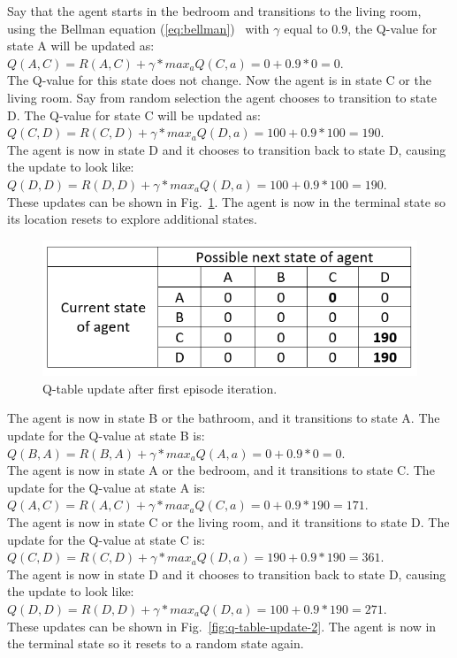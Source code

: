 \documentclass[12pt,american]{report}
\begin{document}
Say that the agent starts in the bedroom and transitions to the living room, using the Bellman equation (\ref{eq:bellman})~\cite{matiisen_2015} with $\gamma$ equal to 0.9, the Q-value for state A will be updated as: \\
$Q(A,C) = R(A,C) + \gamma*max_a Q(C,a) = 0 + 0.9*0 = 0$. \\ 
The Q-value for this state does not change.  Now the agent is in state C or the living room.  Say from random selection the agent chooses to transition to state D. The Q-value for state C will be updated as: \\
$Q(C,D) = R(C,D) + \gamma*max_a Q(D,a) = 100 + 0.9*100 = 190$. \\
The agent is now in state D and it chooses to transition back to state D, causing the update to look like: \\
$Q(D,D) = R(D,D) + \gamma*max_a Q(D,a) = 100 + 0.9*100 = 190$. \\
These updates can be shown in Fig.~\ref{fig:q-table-update-1}. The agent is now in the terminal state so its location resets to explore additional states.  
\begin{figure}
\centering
\includegraphics[scale=1]{images/q-table-update-1.png}
\caption{Q-table update after first episode iteration.}
\label{fig:q-table-update-1}
\end{figure}

The agent is now in state B or the bathroom, and it transitions to state A. The update for the Q-value at state B is: \\
$Q(B,A) = R(B,A) + \gamma*max_a Q(A,a) = 0 + 0.9*0 = 0$. \\
The agent is now in state A or the bedroom, and it transitions to state C. The update for the Q-value at state A is: \\
$Q(A,C) = R(A,C) + \gamma*max_a Q(C,a) = 0 + 0.9*190 = 171$. \\
The agent is now in state C or the living room, and it transitions to state D. The update for the Q-value at state C is: \\
$Q(C,D) = R(C,D) + \gamma*max_a Q(D,a) = 190 + 0.9*190 = 361$.  \\
The agent is now in state D and it chooses to transition back to state D, causing the update to look like: \\
$Q(D,D) = R(D,D) + \gamma*max_a Q(D,a) = 100 + 0.9*190 = 271$. \\
These updates can be shown in Fig.~\ref{fig:q-table-update-2}. The agent is now in the terminal state so it resets to a random state again. 
\end{document}
